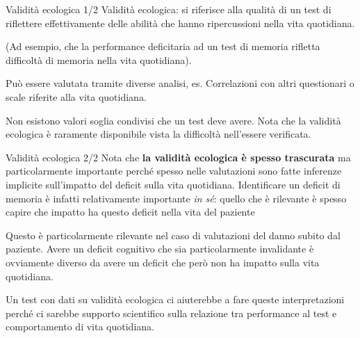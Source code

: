 \documentclass[
  ignorenonframetext,
]{beamer}
\begin{document}
\begin{frame}{Validità ecologica 1/2}
\label{validituxe0-ecologica-12}
Validità ecologica: si riferisce alla qualità di un test di riflettere
effettivamente delle abilità che hanno ripercussioni nella vita
quotidiana.

(Ad esempio, che la performance deficitaria ad un test di memoria
rifletta difficoltà di memoria nella vita quotidiana).

Può essere valutata tramite diverse analisi, es. Correlazioni con altri
questionari o scale riferite alla vita quotidiana.

Non esistono valori soglia condivisi che un test deve avere. Nota che la
validità ecologica è raramente disponibile vista la difficoltà
nell'essere verificata.
\end{frame}

\begin{frame}{Validità ecologica 2/2}
\label{validituxe0-ecologica-22}
Nota che \textbf{la validità ecologica è spesso trascurata} ma
particolarmente importante perché spesso nelle valutazioni sono fatte
inferenze implicite sull'impatto del deficit sulla vita quotidiana.
Identificare un deficit di memoria è infatti relativamente importante
\emph{in sé}: quello che è rilevante è spesso capire che impatto ha
questo deficit nella vita del paziente

Questo è particolarmente rilevante nel caso di valutazioni del danno
subito dal paziente. Avere un deficit cognitivo che sia particolarmente
invalidante è ovviamente diverso da avere un deficit che però non ha
impatto sulla vita quotidiana.

Un test con dati su validità ecologica ci aiuterebbe a fare queste
interpretazioni perché ci sarebbe supporto scientifico sulla relazione
tra performance al test e comportamento di vita quotidiana.
\end{frame}
\end{document}
